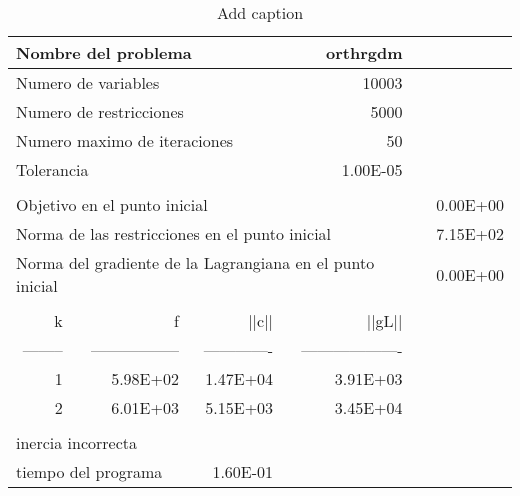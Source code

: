 \begin{table}[htbp]
  \centering
  \caption{Add caption}
    \begin{tabular}{rrrrrr}
    \toprule
    \multicolumn{3}{l}{Nombre del problema} & orthrgdm &       &  \\
    \midrule
    \multicolumn{3}{l}{Numero de variables} & 10003 &       &  \\
    \multicolumn{3}{l}{Numero de restricciones} & 5000  &       &  \\
    \multicolumn{3}{l}{Numero maximo de iteraciones} & 50    &       &  \\
    \multicolumn{3}{l}{Tolerancia} & 1.00E-05 &       &  \\
          &       &       &       &       &  \\
    \multicolumn{5}{l}{Objetivo en el punto inicial} & 0.00E+00 \\
    \multicolumn{5}{l}{Norma de las restricciones en el punto inicial} & 7.15E+02 \\
    \multicolumn{5}{l}{Norma del gradiente de la Lagrangiana en el punto inicial} & 0.00E+00 \\
          &       &       &       &       &  \\
    k     & f     & ||c|| & ||gL|| &       &  \\
    -------- & ----------------- & ------------- & ------------------- &       &  \\
    1     & 5.98E+02 & 1.47E+04 & 3.91E+03 &       &  \\
    2     & 6.01E+03 & 5.15E+03 & 3.45E+04 &       &  \\
          &       &       &       &       &  \\
    \multicolumn{2}{l}{inercia incorrecta} &       &       &       &  \\
    \multicolumn{2}{l}{tiempo del programa} & 1.60E-01 &       &       &  \\
    \bottomrule
    \end{tabular}%
  \label{tab:addlabel}%
\end{table}%
